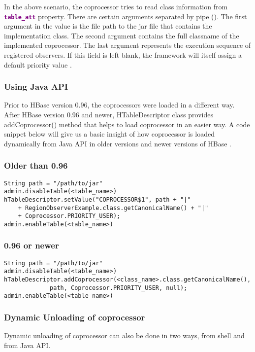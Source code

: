 \documentclass[11pt,a4paper,bibtotoc,idxtotoc,headsepline,footsepline,footexclude,BCOR12mm,DIV13]{scrbook}
\begin{document}
In the above scenario, the coprocessor tries to read class information from \textbf{\textcolor{purple}{\texttt{table\_att}}} property. There are certain arguments separated by pipe (\text{\textbar}). The first argument in the value is the file path to the jar file that contains the implementation class. The second argument contains the full classname of the implemented coprocessor. The last argument represents the execution sequence of registered observers. If this field is left blank, the framework will itself assign a default priority value \cite{hbase:site}.

\subsubsection{Using Java API}
Prior to HBase version 0.96, the coprocessors were loaded in a different way. After HBase version 0.96 and newer, HTableDescriptor class provides addCoprocessor() method that helps to load coprocessor in an easier way. A code snippet below will give us a basic insight of how coprocessor is loaded dynamically from Java API in older versions and newer versions of HBase \cite{hbase:site} .

\subsubsection{Older than 0.96}
\lstset{language=Java}
\begin{lstlisting}
String path = "/path/to/jar"
admin.disableTable(<table_name>)
hTableDescriptor.setValue("COPROCESSOR$1", path + "|"
    + RegionObserverExample.class.getCanonicalName() + "|"
    + Coprocessor.PRIORITY_USER);
admin.enableTable(<table_name>)
\end{lstlisting}

\subsubsection{0.96 or newer} 
\lstset{language=Java}
\begin{lstlisting}
String path = "/path/to/jar"
admin.disableTable(<table_name>)
hTableDescriptor.addCoprocessor(<class_name>.class.getCanonicalName(),
             path, Coprocessor.PRIORITY_USER, null);
admin.enableTable(<table_name>)
\end{lstlisting}

\subsubsection{Dynamic Unloading of coprocessor}
Dynamic unloading of coprocessor can also be done in two ways, from shell and from Java API. 
\end{document}
